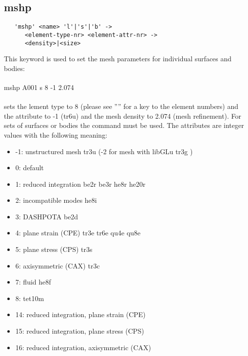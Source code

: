 \documentclass{article}
\begin{document}
\subsection{\label{mshp}mshp}
\begin{verbatim}
   'mshp' <name> 'l'|'s'|'b' ->
      <element-type-nr> <element-attr-nr> ->
      <density>|<size>
\end{verbatim}
This keyword is used to set the mesh parameters for individual surfaces and bodies:\\\\mshp A001 s 8 -1 2.074\\\\sets the lement type to 8 (please see '''' for a key to the element numbers) and the attribute to -1 (tr6u) and the mesh density to 2.074 (mesh refinement). For sets of surfaces or bodies the  command must be used. The attributes are integer values with the following meaning:
\begin{itemize}
\item  -1: unstructured mesh tr3u (-2 for mesh with libGLu tr3g )
\item   0: default
\item   1: reduced integration be2r be3r he8r he20r
\item   2: incompatible modes he8i
\item   3: DASHPOTA be2d
\item   4: plane strain (CPE) tr3e tr6e qu4e qu8e
\item   5: plane stress (CPS) tr3s
\item   6: axisymmetric  (CAX) tr3c
\item   7: fluid he8f
\item   8: tet10m
\item   14: reduced integration, plane strain (CPE)
\item   15: reduced integration, plane stress (CPS)
\item   16: reduced integration, axisymmetric  (CAX)
\end{itemize}
 
\end{document}
